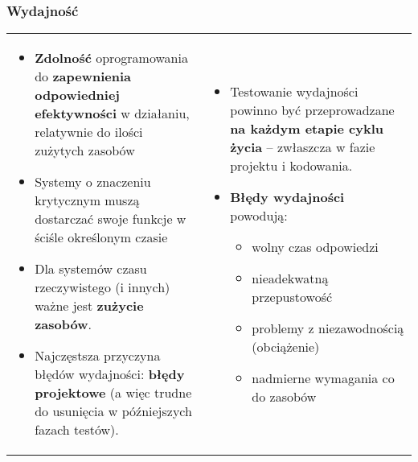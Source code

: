 \documentclass[../main.tex]{subfiles}
\begin{document}
    \subsubsection{Wydajność}
    \begin{table}[H]
        \begin{center}
            \begin{tabular}{ p{8cm}  p{8cm} }
                \begin{itemize}
                    \item \textbf{Zdolność} oprogramowania do \textbf{zapewnienia odpowiedniej efektywności} w działaniu, relatywnie do
                    ilości zużytych zasobów
                    \item Systemy o znaczeniu krytycznym muszą dostarczać swoje funkcje w ściśle określonym czasie
                    \item Dla systemów czasu rzeczywistego (i innych) ważne jest \textbf{zużycie zasobów}.
                    \item Najczęstsza przyczyna błędów wydajności: \textbf{błędy projektowe} (a więc trudne do usunięcia w późniejszych fazach testów).
                \end{itemize}
                &
                \begin{itemize}
                    \item Testowanie wydajności powinno być przeprowadzane \textbf{na każdym etapie cyklu życia} – zwłaszcza w fazie projektu i kodowania.
                    \item \textbf{Błędy wydajności} powodują:
                    \begin{itemize}
                        \item wolny czas odpowiedzi
                        \item nieadekwatną przepustowość
                        \item problemy z niezawodnością (obciążenie)
                        \item nadmierne wymagania co do zasobów
                    \end{itemize}
                \end{itemize}
            \end{tabular}
        \end{center}
    \end{table}
\end{document}
